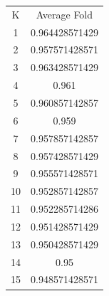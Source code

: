 \documentclass[letterpaper, 12]{article}
\begin{document}
\begin{center}
\begin{tabular}{ |c|c| } 
 \hline
K & Average Fold \\ 
1  &  0.964428571429\\
2  &  0.957571428571\\
3  &  0.963428571429\\
4  &  0.961\\
5  &  0.960857142857\\
6  &  0.959\\
7  &  0.957857142857\\
8  &  0.957428571429\\
9  &  0.955571428571\\
10  &  0.952857142857\\
11  &  0.952285714286\\
12  &  0.951428571429\\
13  &  0.950428571429\\
14  &  0.95\\
15  &  0.948571428571\\
 \hline
\end{tabular}
\end{center}



\end{document}
